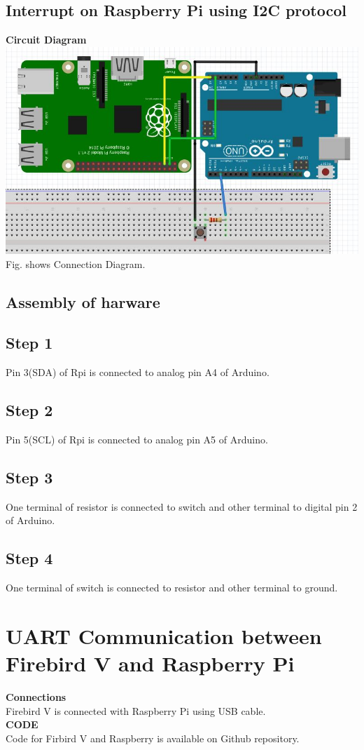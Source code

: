 \documentclass[a4paper,12pt,oneside]{book}
\begin{document}
\subsection*{Interrupt on Raspberry Pi using I2C protocol}
\textbf{Circuit Diagram}  \\
\centering
\includegraphics[scale = 0.6]{rpi_with_arduino}
\flushleft
Fig. shows Connection Diagram.
\subsection*{Assembly of harware}
\subsection*{Step 1}
Pin 3(SDA) of Rpi is connected to analog pin A4 of Arduino.
\subsection*{Step 2}
Pin 5(SCL) of Rpi is connected to analog pin A5 of Arduino.
\subsection*{Step 3}
One terminal of resistor is connected to switch and other terminal to digital pin 2 of Arduino.
\subsection*{Step 4}
One terminal of switch is connected to resistor and other terminal to ground.
\section{UART Communication between Firebird V and Raspberry Pi}
\textbf{Connections}  \\
Firebird V is connected with Raspberry Pi using USB cable.\\
\textbf{CODE}\\
Code for Firbird V and Raspberry is available on Github repository.
\end{document}
